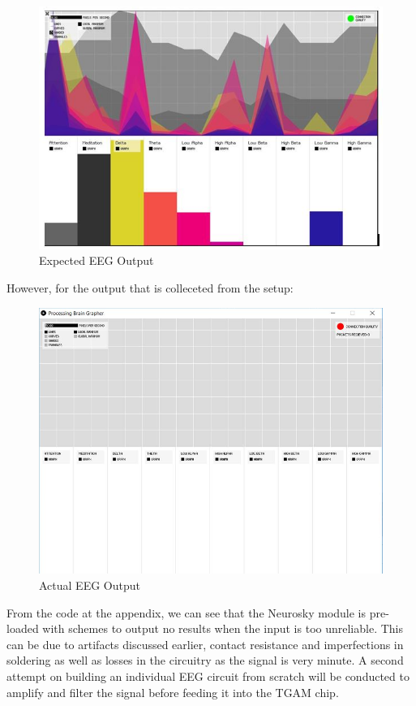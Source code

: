 \begin{figure}[H]
	\centering
	\includegraphics[width=0.8\linewidth]{jiahuipic6.jpg}
	\caption{Expected EEG Output}
\end{figure} 

However, for the output that is colleceted from the setup: 

\begin{figure}[H]
	\centering
	\includegraphics[width=0.8\linewidth]{jiahuipic7.jpg}
	\caption{Actual EEG Output}
\end{figure} 

From the code at the appendix, we can see that the Neurosky module is pre-loaded with schemes to output no results when the input is too unreliable. This can be due to artifacts discussed earlier, contact resistance and imperfections in soldering as well as losses in the circuitry as the signal is very minute. A second attempt on building an individual EEG circuit from scratch will be conducted to amplify and filter the signal before feeding it into the TGAM chip.

